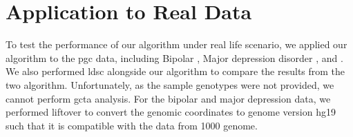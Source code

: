 \documentclass[12pt]{scrbook}
\newcommand*{\glng}{\glsentrylong}
\begin{document}

\section{Application to Real Data}
\label{sec:realData}
To test the performance of our algorithm under real life scenario, we applied our algorithm to the \gls{pgc} data, including Bipolar \citep{PsychiatricGWASConsortiumBipolarDisorderWorkingGroup2011}, Major depression disorder \citep{Ripke2013b}, and \glng{scz} \citep{Ripke2014}.
We also performed \gls{ldsc} alongside our algorithm to compare the results from the two algorithm.
Unfortunately, as the sample genotypes were not provided, we cannot perform \gls{gcta} analysis.
For the bipolar and major depression data, we performed liftover \citep{Hinrichs2006} to convert the genomic coordinates to genome version hg19 such that it is compatible with the data from 1000 genome.
\end{document}
